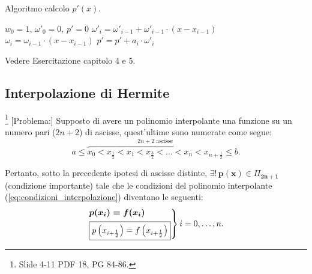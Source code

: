 \begin{algorithm}\caption{Algoritmo calcolo $p'(x)$.}\label{alg:calcP'(x)}
    \begin{algorithmic}
        \State $w_0=1,\, \omega'_0=0,\, p'=0$
            \State $\omega'_i=\omega'_{i-1}+\omega'_{i-1}\cdot (x-x_{i-1})$
            \State $\omega_i=\omega_{i-1}\cdot(x-x_{i-1})$
            \State $p'=p'+a_i\cdot\omega'_i$
        \EndFor
    \end{algorithmic}
\end{algorithm}

\begin{example}
	Vedere Esercitazione capitolo 4 e 5.
\end{example}

\subsection{Interpolazione di Hermite}\footnote{Slide 4-11 PDF 18, PG 84-86.}
[Problema:] Supposto di avere un polinomio interpolante una funzione su un numero pari ($2n+2$) di ascisse, quest'ultime sono numerate come segue:
\begin{equation}
    a\leq\overbrace{x_0 < x_{\frac{1}{2}} < x_1 < x_{\frac{3}{2}} < \hdots < x_n < x_{n+\frac{1}{2}}}^{2n+2\text{ ascisse}}\leq b.
\end{equation}

Pertanto, sotto la precedente ipotesi di ascisse distinte, $\boldsymbol{\exists!\, p(x)}\in\Pi_{\boldsymbol{2n+1}}$ (condizione importante) tale che le condizioni del polinomio interpolante (\ref{eq:condizioni_interpolazione}) diventano le seguenti:
\begin{equation}\label{eq:hermCondPolInterp}
    \begin{rcases}
        \boldsymbol{p(x_i)=f(x_i)}\\
        \boxed{p\left(x_{i+\frac{1}{2}}\right)=f\left(x_{i+\frac{1}{2}}\right)}
    \end{rcases} i=0,\hdots,n.
\end{equation}

